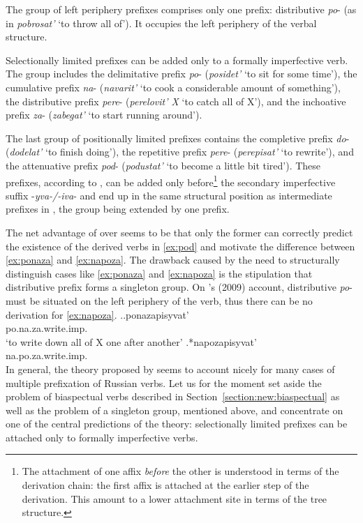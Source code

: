 The group of left periphery prefixes comprises only one prefix: distributive \textit{po}- (as in \textit{pobrosat'} `to throw all of'). It occupies the left periphery of the verbal structure.

Selectionally limited prefixes can be added only to a formally imperfective verb. The group includes the delimitative prefix \textit{po}- (\textit{posidet'} `to sit for some time'), the cumulative prefix \textit{na}- (\textit{navarit'} `to cook a considerable amount of something'), the distributive prefix \textit{pere}- (\textit{perelovit' X} `to catch all of X'), and the inchoative prefix \textit{za}- (\textit{zabegat'} `to start running around').

The last group of positionally limited prefixes contains the completive prefix \textit{do}- (\textit{dodelat'} `to finish doing'), the repetitive prefix \textit{pere}- (\textit{perepisat'} `to rewrite'), and the attenuative prefix \textit{pod}- (\textit{podustat'} `to become a little bit tired'). These prefixes, according to \citet{Tatevosov:09}, can be added only before\footnote{The attachment of one affix \textit{before} the other is understood in terms of the derivation chain: the first affix is attached at the earlier step of the derivation. This amount to a lower attachment site in terms of the tree structure.} the secondary imperfective suffix -\textit{yva-/-iva}- and end up in the same structural position as intermediate prefixes in \citet{Tatevosov:07}, the group being extended by one prefix.
	
The net advantage of \citet{Tatevosov:09} over \citet{Tatevosov:07} seems to be that only the former can correctly predict the existence of the derived verbs in \ref{ex:pod} and motivate the difference between \ref{ex:ponaza} and \ref{ex:napoza}. The drawback caused by the need to structurally distinguish cases like \ref{ex:ponaza} and \ref{ex:napoza} is the stipulation that distributive prefix  forms a singleton group. On \citeauthor{Tatevosov:09}'s (2009) account, distributive \textit{po}- must be situated on the left periphery of the verb, thus there can be no derivation for \ref{ex:napoza}.
\ex.\ag.\label{ex:ponaza}ponazapisyvat'\\
po.na.za.write.imp.\\
\trans `to write down all of X one after another'
\bg.\label{ex:napoza}*napozapisyvat'\\
na.po.za.write.imp.\\

In general, the theory proposed by \citet{Tatevosov:09} seems to account nicely for many cases of multiple prefixation of Russian verbs. Let us for the moment set aside the problem of biaspectual verbs described in Section~\ref{section:new:biaspectual} as well as the problem of a singleton group, mentioned above, and concentrate on one of the central predictions of the theory: selectionally limited prefixes can be attached only to formally imperfective verbs.


